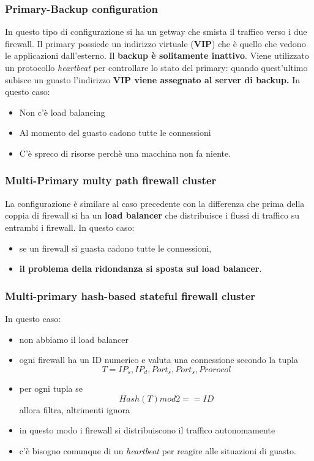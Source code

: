\documentclass[12pt]{article}
\begin{document}
			\subsubsection{Primary-Backup configuration }
				In questo tipo di configurazione si ha un getway che smista il traffico verso i due firewall. Il primary possiede un indirizzo virtuale (\textbf{VIP}) che è quello che vedono le applicazioni dall'esterno. Il \textbf{backup è solitamente inattivo}. Viene utilizzato un protocollo \textit{heartbeat} per controllare lo stato del primary: quando quest'ultimo subisce un guasto l'indirizzo \textbf{VIP viene assegnato al server di backup.} In questo caso:
				\begin{itemize}
					\item Non c'è load balancing
					\item Al momento del guasto cadono tutte le connessioni
					\item C'è spreco di risorse perchè una macchina non fa niente.
				\end{itemize}
			\subsubsection{Multi-Primary multy path firewall cluster}
				La configurazione è similare al caso precedente con la differenza che prima della coppia di firewall si ha un \textbf{load balancer} che distribuisce i flussi di traffico su entrambi i firewall. In questo caso:
				\begin{itemize}
					\item se un firewall si guasta cadono tutte le connessioni,
					\item \textbf{il problema della ridondanza si sposta sul load balancer}.
				\end{itemize}  
			\subsubsection{Multi-primary hash-based stateful firewall cluster}
				In questo caso:
				\begin{itemize}
					\item non abbiamo il load balancer
					\item ogni firewall ha un ID numerico e valuta una connessione secondo la tupla $$T = IP_{s}, IP_{d}, Port_{s}, Port_{s}, Prorocol  $$
					\item per ogni tupla se $$Hash(T)mod 2 == ID $$ allora filtra, altrimenti ignora
					\item in questo modo i firewall si distribuiscono il traffico autonomamente
					\item c'è bisogno comunque di un \textit{heartbeat} per reagire alle situazioni di guasto.
				\end{itemize} 
				
\end{document}
